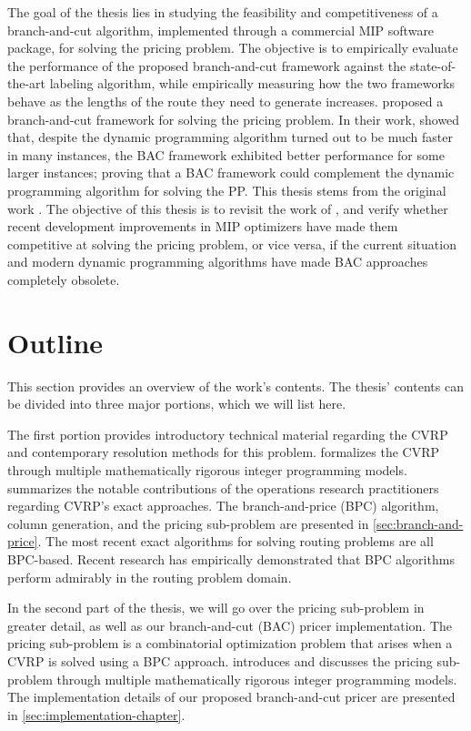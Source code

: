 The goal of the thesis lies in studying the feasibility and competitiveness of a
branch-and-cut algorithm, implemented through a commercial MIP software package,
for solving the pricing problem.
The objective is to empirically evaluate the performance of the proposed
branch-and-cut framework against the state-of-the-art labeling
algorithm, while empirically measuring how the two frameworks behave
as the lengths of the route they need to generate increases.
\cite{jepsen2014} proposed a branch-and-cut framework for solving the pricing problem.
In their work, \citeauthor{jepsen2014} showed that, despite the dynamic programming algorithm
turned out to be much faster in many instances, the BAC framework exhibited
better performance for some larger instances; proving that
a BAC framework could complement the dynamic programming algorithm for solving the PP.
This thesis stems from the original work \citeauthor{jepsen2014}.
The objective of this thesis is to revisit the work of \citeauthor{jepsen2014},
and verify whether recent development improvements in MIP optimizers
have made them competitive at solving the pricing problem,
or vice versa,
if the current situation and modern dynamic programming algorithms have
made BAC approaches completely obsolete.

\section{Outline}
\label{sec:intro-outline}

This section provides an overview of the work's contents.
The thesis' contents can be divided into three major portions, which we will list here.

The first portion provides introductory technical material
regarding the CVRP and contemporary resolution methods for this problem.
 formalizes the CVRP
through multiple mathematically rigorous integer programming models.
 summarizes the notable contributions
of the operations research practitioners regarding CVRP's exact approaches.
The branch-and-price (BPC) algorithm, column generation,
and the pricing sub-problem are presented in \cref{sec:branch-and-price}.
The most recent exact algorithms for solving routing problems are all BPC-based.
Recent research has empirically demonstrated that BPC algorithms
perform admirably in the routing problem domain.

In the second part of the thesis,
we will go over the pricing sub-problem in greater detail,
as well as our branch-and-cut (BAC) pricer implementation.
The pricing sub-problem is a combinatorial optimization problem
that arises when a CVRP is solved using a BPC approach.
 introduces and discusses the pricing sub-problem
through multiple mathematically rigorous integer programming models.
The implementation details of our proposed branch-and-cut pricer
are presented in \cref{sec:implementation-chapter}.

